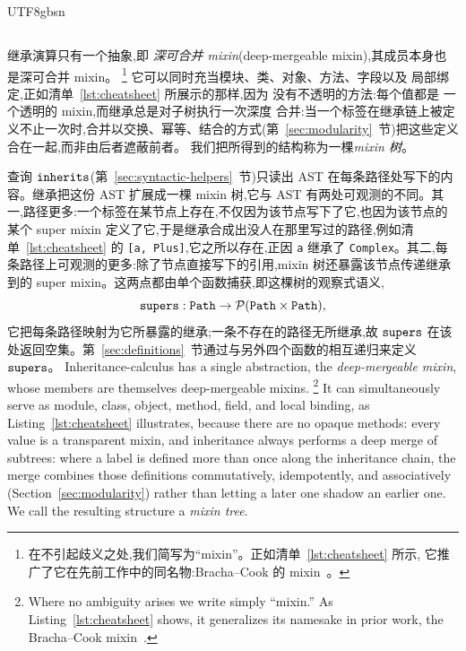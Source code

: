 \begin{CJK*}{UTF8}{gbsn}
\subsection{}

\ifPaperChinese
继承演算只有一个抽象,即
\emph{深可合并 mixin}(deep-mergeable mixin),其成员本身也是深可合并 mixin。%
\footnote{
  在不引起歧义之处,我们简写为``mixin''。正如清单~\ref{lst:cheatsheet} 所示,
  它推广了它在先前工作中的同名物:Bracha--Cook 的
  mixin~\cite{bracha1990-mixin-inheritance}。
}
它可以同时充当模块、类、对象、方法、字段以及
局部绑定,正如清单~\ref{lst:cheatsheet} 所展示的那样,因为
没有不透明的方法:每个值都是
一个透明的 mixin,而继承总是对子树执行一次深度
合并:当一个标签在继承链上被定义不止一次时,合并以交换、幂等、结合的方式(第~\ref{sec:modularity}~节)把这些定义合在一起,而非由后者遮蔽前者。
我们把所得到的结构称为一棵\emph{mixin 树}。

查询 $\mathtt{inherits}$(第~\ref{sec:syntactic-helpers}~节)只读出 AST 在每条路径处写下的内容。继承把这份 AST 扩展成一棵 mixin 树,它与 AST 有两处可观测的不同。其一,路径更多:一个标签在某节点上存在,不仅因为该节点写下了它,也因为该节点的某个 super mixin 定义了它,于是继承合成出没人在那里写过的路径,例如清单~\ref{lst:cheatsheet} 的 \texttt{[a, Plus]},它之所以存在,正因 \texttt{a} 继承了 \texttt{Complex}。其二,每条路径上可观测的更多:除了节点直接写下的引用,mixin 树还暴露该节点传递继承到的 super mixin。这两点都由单个函数捕获,即这棵树的观察式语义,
\begin{equation}\label{eq:supers-signature}
  \mathtt{supers} : \mathtt{Path} \to \mathcal{P}(\mathtt{Path} \times \mathtt{Path}),
\end{equation}
它把每条路径映射为它所暴露的继承;一条不存在的路径无所继承,故 $\mathtt{supers}$ 在该处返回空集。第~\ref{sec:definitions}~节通过与另外四个函数的相互递归来定义 $\mathtt{supers}$。
\else
Inheritance-calculus has a single abstraction, the
\emph{deep-mergeable mixin}, whose members are themselves deep-mergeable mixins.%
\footnote{
  Where no ambiguity arises we write simply ``mixin.'' As
  Listing~\ref{lst:cheatsheet} shows, it generalizes its namesake in prior
  work, the Bracha--Cook mixin~\cite{bracha1990-mixin-inheritance}.
}
It can simultaneously serve as module, class, object, method, field, and
local binding, as Listing~\ref{lst:cheatsheet} illustrates, because there
are no opaque methods: every value is
a transparent mixin, and inheritance always performs a deep
merge of subtrees: where a label is defined more than once along the
inheritance chain, the merge combines those definitions commutatively,
idempotently, and associatively (Section~\ref{sec:modularity}) rather
than letting a later one shadow an earlier one.
We call the resulting structure a \emph{mixin tree}.


\end{CJK*}
